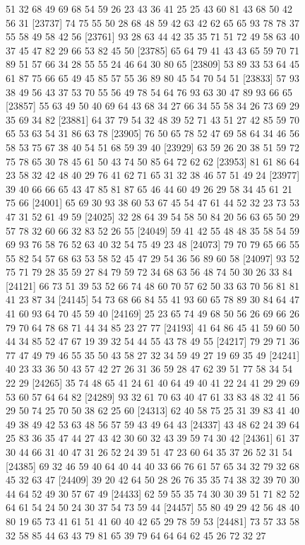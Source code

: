 \documentclass{article}
\begin{document}
\begin{figure}[H]
\begin{Schunk}
\begin{Soutput}
[23713] 51 32 68 49 69 68 54 59 26 23 43 36 41 25 25 43 60 81 43 68 50 42 56 31
[23737] 74 75 55 50 28 68 48 59 42 63 42 62 65 65 93 78 78 37 55 58 49 58 42 56
[23761] 93 28 63 44 42 35 35 71 51 72 49 58 63 40 37 45 47 82 29 66 53 82 45 50
[23785] 65 64 79 41 43 43 65 59 70 71 89 51 57 66 34 28 55 55 24 46 64 30 80 65
[23809] 53 89 33 53 64 45 61 87 75 66 65 49 45 85 57 55 36 89 80 45 54 70 54 51
[23833] 57 93 38 49 56 43 37 53 70 55 56 49 78 54 64 76 93 63 30 47 89 93 66 65
[23857] 55 63 49 50 40 69 64 43 68 34 27 66 34 55 58 34 26 73 69 29 35 69 34 82
[23881] 64 37 79 54 32 48 39 52 71 43 51 27 42 85 59 70 65 53 63 54 31 86 63 78
[23905] 76 50 65 78 52 47 69 58 64 34 46 56 58 53 75 67 38 40 54 51 68 59 39 40
[23929] 63 59 26 20 38 51 59 72 75 78 65 30 78 45 61 50 43 74 50 85 64 72 62 62
[23953] 81 61 86 64 23 58 32 42 48 40 29 76 41 62 71 65 31 32 38 46 57 51 49 24
[23977] 39 40 66 66 65 43 47 85 81 87 65 46 44 60 49 26 29 58 34 45 61 21 75 66
[24001] 65 69 30 93 38 60 53 67 45 54 47 61 44 52 32 23 73 53 47 31 52 61 49 59
[24025] 32 28 64 39 54 58 50 84 20 56 63 65 50 29 57 78 32 60 66 32 83 52 26 55
[24049] 59 41 42 55 48 48 35 58 54 59 69 93 76 58 76 52 63 40 32 54 75 49 23 48
[24073] 79 70 79 65 66 55 55 82 54 57 68 63 53 58 52 45 47 29 54 36 56 89 60 58
[24097] 93 52 75 71 79 28 35 59 27 84 79 59 72 34 68 63 56 48 74 50 30 26 33 84
[24121] 66 73 51 39 53 52 66 74 48 60 70 57 62 50 33 63 70 56 81 81 41 23 87 34
[24145] 54 73 68 66 84 55 41 93 60 65 78 89 30 84 64 47 41 60 93 64 70 45 59 40
[24169] 25 23 65 74 49 68 50 56 26 69 66 26 79 70 64 78 68 71 44 34 85 23 27 77
[24193] 41 64 86 45 41 59 60 50 44 34 85 52 47 67 19 39 32 54 44 55 43 78 49 55
[24217] 79 29 71 36 77 47 49 79 46 55 35 50 43 58 27 32 34 59 49 27 19 69 35 49
[24241] 40 23 33 36 50 43 57 42 27 26 31 36 59 28 47 62 39 51 77 58 34 54 22 29
[24265] 35 74 48 65 41 24 61 40 64 49 40 41 22 24 41 29 29 69 53 60 57 64 64 82
[24289] 93 32 61 70 63 40 47 61 33 83 48 32 41 56 29 50 74 25 70 50 38 62 25 60
[24313] 62 40 58 75 25 31 39 83 41 40 49 38 49 42 53 63 48 56 57 59 43 49 64 43
[24337] 43 48 62 24 39 64 25 83 36 35 47 44 27 43 42 30 60 32 43 39 59 74 30 42
[24361] 61 37 30 44 66 31 40 47 31 26 52 24 39 51 47 23 60 64 35 37 26 52 31 54
[24385] 69 32 46 59 40 64 40 44 40 33 66 76 61 57 65 34 32 79 32 68 45 32 63 47
[24409] 39 20 42 64 50 28 26 76 35 35 74 38 32 39 70 30 44 64 52 49 30 57 67 49
[24433] 62 59 55 35 74 30 30 39 51 71 82 52 64 61 54 24 50 24 30 37 54 73 59 44
[24457] 55 80 49 29 42 56 48 40 80 19 65 73 41 61 51 41 60 40 42 65 29 78 59 53
[24481] 73 57 33 58 32 58 85 44 63 43 79 81 65 39 79 64 64 64 62 45 26 72 32 27

\end{Soutput}
\end{Schunk}
\end{figure}
\end{document}
